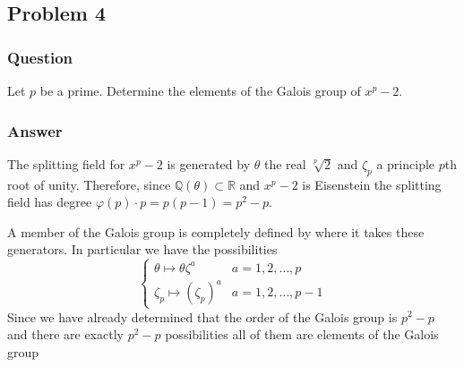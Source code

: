 \documentclass[10pt]{article}
\begin{document}
\subsection{Problem 4}
\subsubsection{Question}
Let $p$ be a prime. Determine the elements of the Galois group of $x^p-2$.
\subsubsection{Answer}
The splitting field for $x^p-2$ is generated by $\theta$ the real $\sqrt[p]2$ and $\zeta_p$ a principle $p$th root of unity. Therefore, since $\mathbb{Q}(\theta) \subset \mathbb{R}$ and $x^p-2$ is Eisenstein the splitting field has degree $\varphi(p) \cdot p = p(p-1) = p^2-p$.

A member of the Galois group is completely defined by where it takes these generators. In particular we have the possibilities
\[\left\{ \begin{array}{ll} 
\theta \mapsto \theta\zeta^a & a = 1,2, \dots, p \\
\zeta_p \mapsto (\zeta_p)^a & a = 1, 2, \dots, p-1
\end{array}\right.\]
Since we have already determined that the order of the Galois group is $p^2-p$ and there are exactly $p^2-p$ possibilities all of them are elements of the Galois group 
\end{document}
